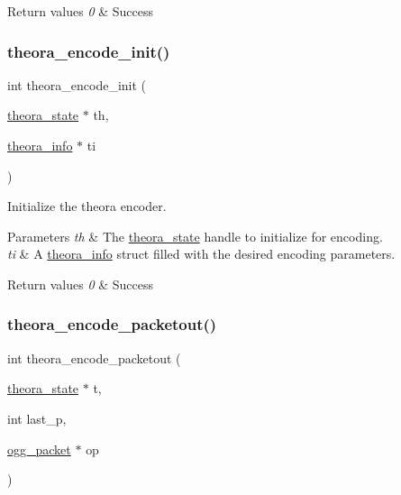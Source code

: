 \begin{DoxyRetVals}{Return values}
{\em 0} & Success \\
\hline
\end{DoxyRetVals}
\mbox{\label{group__oldfuncs_ga0f7ad4d4b2343278cb4ba8fb2bd5109a}} 
\subsubsection{\texorpdfstring{theora\+\_\+encode\+\_\+init()}{theora\_encode\_init()}}
{\footnotesize\ttfamily int theora\+\_\+encode\+\_\+init (\begin{DoxyParamCaption}\item[{\hyperlink{structtheora__state}{theora\+\_\+state} $\ast$}]{th,  }\item[{\hyperlink{structtheora__info}{theora\+\_\+info} $\ast$}]{ti }\end{DoxyParamCaption})}

Initialize the theora encoder. 
\begin{DoxyParams}{Parameters}
{\em th} & The \hyperlink{structtheora__state}{theora\+\_\+state} handle to initialize for encoding. \\
\hline
{\em ti} & A \hyperlink{structtheora__info}{theora\+\_\+info} struct filled with the desired encoding parameters. \\
\hline
\end{DoxyParams}

\begin{DoxyRetVals}{Return values}
{\em 0} & Success \\
\hline
\end{DoxyRetVals}
\mbox{\label{group__oldfuncs_ga5f4929677a735bc2198c2309d235f1b3}} 
\subsubsection{\texorpdfstring{theora\+\_\+encode\+\_\+packetout()}{theora\_encode\_packetout()}}
{\footnotesize\ttfamily int theora\+\_\+encode\+\_\+packetout (\begin{DoxyParamCaption}\item[{\hyperlink{structtheora__state}{theora\+\_\+state} $\ast$}]{t,  }\item[{int}]{last\+\_\+p,  }\item[{\hyperlink{structogg__packet}{ogg\+\_\+packet} $\ast$}]{op }\end{DoxyParamCaption})}

